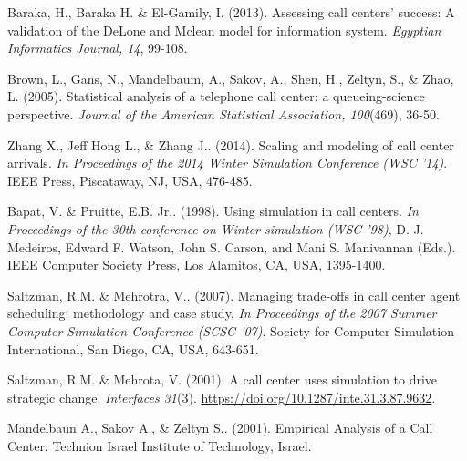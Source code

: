 \documentclass[12pt,twocolumn]{article}
\begin{document}
\newpage
\clearpage
{}
\begin{thebibliography}{7}
Baraka, H., Baraka H. \& El-Gamily, I. (2013). Assessing call centers' success: A validation of the DeLone and Mclean model for information system. \textit{Egyptian Informatics Journal, 14}, 99-108.

Brown, L., Gans, N., Mandelbaum, A., Sakov, A., Shen, H., Zeltyn, S., \& Zhao, L. (2005). Statistical analysis of a telephone call center: a queueing-science perspective. \textit{Journal of the American Statistical Association, 100}(469), 36-50.

Zhang X., Jeff Hong L., \& Zhang J.. (2014). Scaling and modeling of call center arrivals. \textit{In Proceedings of the 2014 Winter Simulation Conference (WSC '14)}. IEEE Press, Piscataway, NJ, USA, 476-485.

Bapat, V. \& Pruitte, E.B. Jr.. (1998). Using simulation in call centers. \textit{In Proceedings of the 30th conference on Winter simulation (WSC '98)}, D. J. Medeiros, Edward F. Watson, John S. Carson, and Mani S. Manivannan (Eds.). IEEE Computer Society Press, Los Alamitos, CA, USA, 1395-1400.

Saltzman, R.M. \& Mehrotra, V.. (2007). Managing trade-offs in call center agent scheduling: methodology and case study. \textit{In Proceedings of the 2007 Summer Computer Simulation Conference (SCSC '07)}. Society for Computer Simulation International, San Diego, CA, USA, 643-651.

Saltzman, R.M. \& Mehrota, V. (2001). A call center uses simulation to drive strategic change. \textit{Interfaces 31}(3). \href{https://doi.org/10.1287/inte.31.3.87.9632}{https://doi.org/10.1287/inte.31.3.87.9632}. 

Mandelbaun A., Sakov A., \& Zeltyn S.. (2001). Empirical Analysis of a Call Center. Technion Israel Institute of Technology, Israel.

\end{thebibliography}
\end{document}
